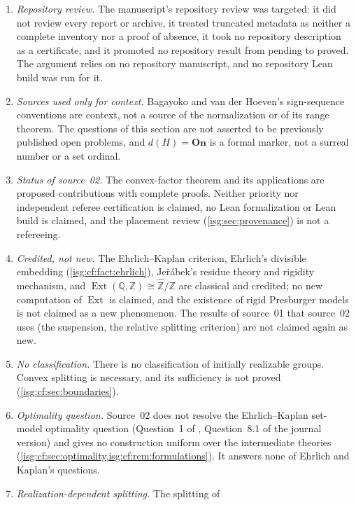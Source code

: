 \documentclass[11pt]{article}
\theoremstyle{definition}
\theoremstyle{remark}
\newcommand{\On}{\ensuremath{\mathbf{On}}}
\newcommand{\Z}{\mathbb{Z}}
\newcommand{\Q}{\mathbb{Q}}
\newcommand{\Zhat}{\widehat{\Z}}
\newcommand{\Ext}{\operatorname{Ext}}
\begin{document}
\begin{enumerate}[label=\textup{(N\arabic*)},leftmargin=*]
\item \emph{Repository review.} The manuscript's repository review was
      targeted: it did not review every report or archive, it treated
      truncated metadata as neither a complete inventory nor a proof of
      absence, it took no repository description as a certificate, and it
      promoted no repository result from pending to proved. The argument
      relies on no repository manuscript, and no repository Lean build was
      run for it.
\item \emph{Sources used only for context.} Bagayoko and van der Hoeven's
      sign-sequence conventions are context, not a source of the
      normalization or of its range theorem. The questions of this section
      are not asserted to be previously published open problems, and
      $d(H)=\On$ is a formal marker, not a surreal number or a set
      ordinal.
\item \emph{Status of source~02.} The convex-factor theorem and its
      applications are proposed contributions with complete proofs.
      Neither priority nor independent referee certification is claimed,
      no Lean formalization or Lean build is claimed, and the placement
      review (\cref{isg:sec:provenance}) is not a refereeing.
\item \emph{Credited, not new.} The Ehrlich--Kaplan criterion,
      Ehrlich's divisible embedding (\cref{isg:cf:fact:ehrlich}),
      Je\v r\'abek's residue theory and rigidity mechanism, and
      $\Ext(\Q,\Z)\cong\Zhat/\Z$ are classical and credited; no new
      computation of $\Ext$ is claimed, and the existence of rigid
      Presburger models is not claimed as a new phenomenon. The results
      of source~01 that source~02 uses (the suspension, the relative
      splitting criterion) are not claimed again as new.
\item \emph{No classification.} There is no classification of initially
      realizable groups. Convex splitting is necessary, and its
      sufficiency is not proved (\cref{isg:cf:sec:boundaries}).
\item \emph{Optimality question.} Source~02 does not resolve the
      Ehrlich--Kaplan set-model optimality question (Question~1 of
      \cite{EK}, Question~8.1 of the journal version) and gives no
      construction uniform over the intermediate theories
      (\cref{isg:cf:sec:optimality,isg:cf:rem:formulations}). It answers
      none of Ehrlich and Kaplan's questions.
\item \emph{Realization-dependent splitting.} The splitting of

\end{enumerate}
\end{document}
